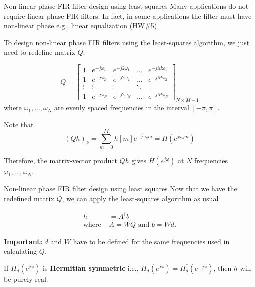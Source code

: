 \documentclass[10pt]{beamer}
\begin{document}
%
\begin{frame}{Non-linear phase FIR filter design using least squares}
	Many applications do not require linear phase FIR filters. In fact, in some applications the filter must have non-linear phase e.g., linear equalization (HW\#5)
	
	To design non-linear phase FIR filters using the least-squares algorithm, we just need to redefine matrix $Q$: 
	
	\begin{equation*}
		Q = \begin{bmatrix}
		1 & e^{-j\omega_1} & e^{-j2\omega_1} & \ldots & e^{-jM\omega_1} \\
		1 & e^{-j\omega_2} & e^{-j2\omega_2} & \ldots & e^{-jM\omega_2} \\
		\vdots & \vdots &  \vdots & \ddots & \vdots \\
		1 & e^{-j\omega_N} & e^{-j2\omega_N} & \ldots & e^{-jM\omega_N}
		\end{bmatrix}_{N\times M+1}
	\end{equation*}
	where $\omega_1, \ldots, \omega_N$ are evenly spaced frequencies in the interval $[-\pi, \pi]$.
	
	Note that
	\begin{equation*}
		(Qh)_k = \sum_{m = 0}^{M}h[m]e^{-j\omega_km} = H(e^{j\omega_km}) \tag{the DTFT of $h[m]$ at frequency $\omega_k$}
	\end{equation*}	
	
	Therefore, the matrix-vector product $Qh$ gives $H(e^{j\omega})$ at $N$ frequencies $\omega_1, \ldots, \omega_N$.
\end{frame}

%
\begin{frame}{Non-linear phase FIR filter design using least squares}
Now that we have the redefined matrix $Q$, we can apply the least-squares algorithm as usual

\begin{align*}
	h &= A^{\dagger}b \tag{least squares solution} \\
	\text{where } & A = WQ \text{ and } b = Wd. 
\end{align*}

\textbf{Important:} $d$ and $W$ have to be defined for the same frequencies used in calculating $Q$.

If $H_d(e^{j\omega})$ is \textbf{Hermitian symmetric} i.e., $H_d(e^{j\omega}) = H_d^*(e^{-j\omega})$, then $h$ will be purely real.

\end{frame}
\end{document}
